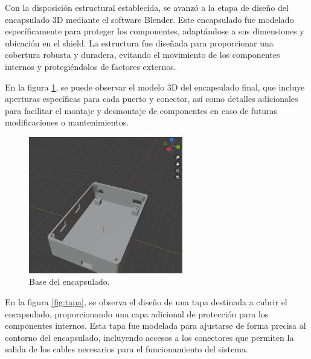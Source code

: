 Con la disposición estructural establecida, se avanzó a la etapa de diseño del encapsulado 3D mediante el software Blender. Este encapsulado fue modelado específicamente para proteger los componentes, adaptándose a sus dimensiones y ubicación en el shield. La estructura fue diseñada para proporcionar una cobertura robusta y duradera, evitando el movimiento de los componentes internos y protegiéndolos de factores externos.


En la figura \ref{fig:case}, se puede observar el modelo 3D del encapsulado final, que incluye aperturas específicas para cada puerto y conector, así como detalles adicionales para facilitar el montaje y desmontaje de componentes en caso de futuras modificaciones o mantenimientos. 

\begin{figure}[H]
\leavevmode
\begin{minipage}{\textwidth}
\begin{center}
\includegraphics[width=0.6\textwidth]{./capitulo_04/imagen/casebase.png}
\caption{Base del encapsulado.\label{fig:case}}
\end{center}
\end{minipage}
\end{figure}

En la figura \ref{fig:tapa}, se observa el diseño de una tapa destinada a cubrir el encapsulado, proporcionando una capa adicional de protección para los componentes internos. Esta tapa fue modelada para ajustarse de forma precisa al contorno del encapsulado, incluyendo accesos a los conectores que permiten la salida de los cables necesarios para el funcionamiento del sistema.


